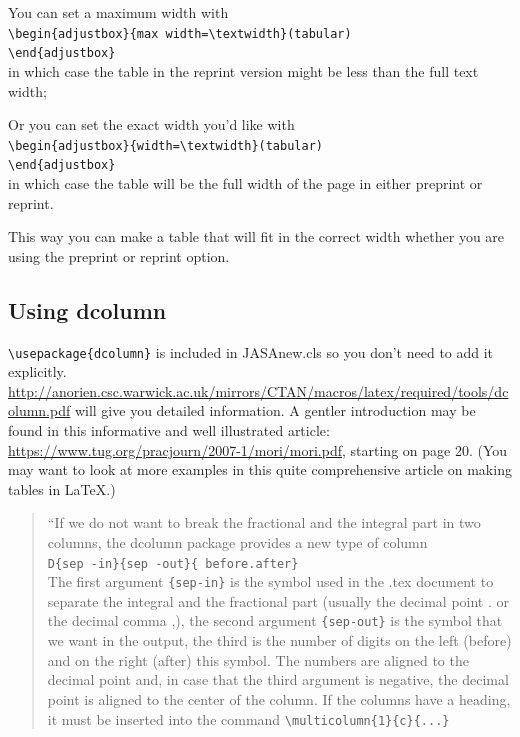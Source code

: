 \documentclass[reprint]{JASAnew}
\begin{document}
You can set a maximum width with \\
\verb+\begin{adjustbox}{max width=\textwidth}(tabular)+\\
\verb+\end{adjustbox}+\\  
in which case the table in the reprint version might be less than
the full text width;

Or you can set the exact width you'd like with\\
\verb+\begin{adjustbox}{width=\textwidth}(tabular)+\\
\verb+\end{adjustbox}+\\
in which case the table will be the full width of the page in
either preprint or reprint.

This way you can make a table that will fit in the correct width
whether you are using the preprint or reprint option.



\subsection{Using dcolumn}
\verb+\usepackage{dcolumn}+ is included in JASAnew.cls so you
don't need to add it explicitly.
\href{http://anorien.csc.warwick.ac.uk/mirrors/CTAN/macros/latex/required/tools/dcolumn.pdf}
{\url{http://anorien.csc.warwick.ac.uk/mirrors/CTAN/macros/latex/required/tools/dcolumn.pdf}}
will give you detailed information.
A gentler introduction may be found in this informative and well
illustrated
article: \href{https://www.tug.org/pracjourn/2007-1/mori/mori.pdf}
{\url{https://www.tug.org/pracjourn/2007-1/mori/mori.pdf}}, starting on page
20. (You may want to look at more examples in this quite comprehensive
article on making tables in \LaTeX.)

\begin{quote}
``If we do not want to break the fractional and the integral part in two columns,
the dcolumn package provides a new type of column\\
\verb+D{sep -in}{sep -out}{ before.after}+\\
The first argument \verb+{sep-in}+ is the symbol used in the
.tex document to separate
the integral and the fractional part (usually the decimal point . or the decimal
comma ,), the second argument \verb+{sep-out}+
is the symbol that we want in the
output, the third is the number of digits on the left (before) and on the right
(after) this symbol. The numbers are aligned to the decimal point and, in case
that the third argument is negative, the decimal point is aligned to the center of
the column. If the columns have a heading, it must be inserted into
the command \verb+\multicolumn{1}{c}{...}+
\end{quote}
\end{document}
